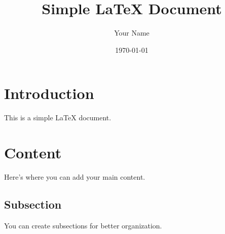 \documentclass{article}
\title{Simple LaTeX Document}
\author{Your Name}
\date{\today}
\begin{document}
\maketitle

\section{Introduction}
This is a simple LaTeX document.

\section{Content}
Here's where you can add your main content.

\subsection{Subsection}
You can create subsections for better organization.
\end{document}
